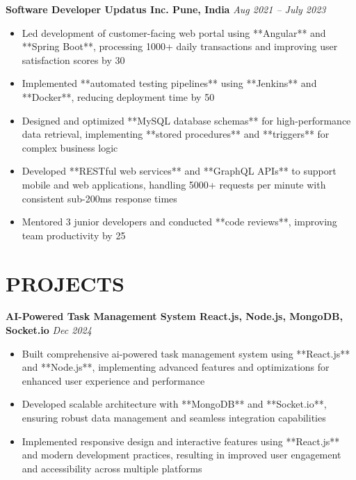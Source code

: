 \documentclass[letterpaper,10pt]{article}
\begin{document}
\vspace{0.2cm}

\noindent
\textbf{Software Developer \textbar{} Updatus Inc. \textbar{} Pune, India} \hfill \textit{Aug 2021 -- July 2023}
\begin{itemize}[itemsep=0cm, topsep=0.1cm]
\justifying
    \item Led development of customer-facing web portal using **Angular** and **Spring Boot**, processing 1000+ daily transactions and improving user satisfaction scores by 30%
    \item Implemented **automated testing pipelines** using **Jenkins** and **Docker**, reducing deployment time by 50%
    \item Designed and optimized **MySQL database schemas** for high-performance data retrieval, implementing **stored procedures** and **triggers** for complex business logic
    \item Developed **RESTful web services** and **GraphQL APIs** to support mobile and web applications, handling 5000+ requests per minute with consistent sub-200ms response times
    \item Mentored 3 junior developers and conducted **code reviews**, improving team productivity by 25%
\end{itemize}

\section*{\large PROJECTS}

\noindent
\textbf{AI-Powered Task Management System \textbar{} React.js, Node.js, MongoDB, Socket.io} \hfill \textit{Dec 2024}
\begin{itemize}[itemsep=0cm, topsep=0.1cm]
\justifying
    \item Built comprehensive ai-powered task management system using **React.js** and **Node.js**, implementing advanced features and optimizations for enhanced user experience and performance
    \item Developed scalable architecture with **MongoDB** and **Socket.io**, ensuring robust data management and seamless integration capabilities
    \item Implemented responsive design and interactive features using **React.js** and modern development practices, resulting in improved user engagement and accessibility across multiple platforms
\end{itemize}
\end{document}
